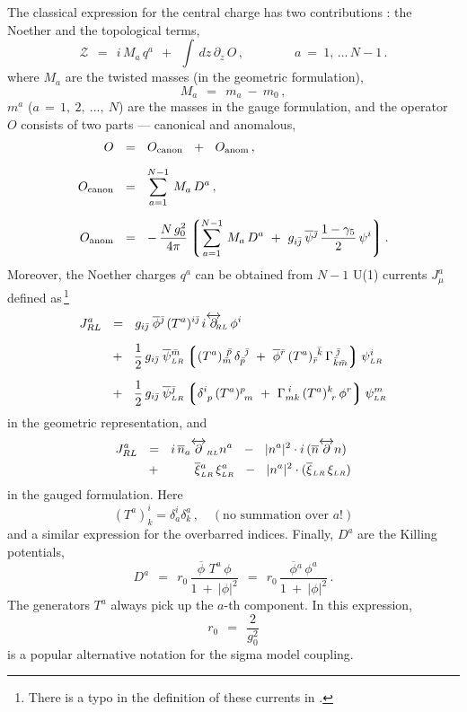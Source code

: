 \documentclass[epsfig,12pt]{article}
\def\beq{\begin{equation}}
\def\eeq{\end{equation}}
\def\beq{\begin{equation}}
\def\eeq{\end{equation}}
\newcommand{\p}{\partial}
\newcommand{\ov}{\overline}
\newcommand{\mc}[1]{\mathcal{#1}}
\newcommand{\lgr}{\left\lgroup}
\newcommand{\rgr}{\right\rgroup}
\newcommand{\bpsi}{\ov{\psi}{}}
\newcommand{\bphi}{\ov{\phi}{}}
\newcommand{\bxi}{\ov{\xi}{}}
\newcommand{\bj}{{\bar \jmath}}
\newcommand{\bmm}{{\bar m}}
\newcommand{\bp}{{\bar p}}
\newcommand{\bkk}{{\bar k}}
\newcommand{\br}{{\bar r}}
\begin{document}
	The classical expression for the central charge has two contributions \cite{SVZw}:
	the Noether and the topological terms,
\beq
        \mc{Z} ~~=~~ i\, M_a\, q^a  ~~+~~ \int\, dz\, \p_z\, O \,, \qquad\qquad
	a ~=~ 1,\,...\, N-1\,.
	\label{21}
\eeq
	where $ M_a $ are the twisted masses (in the geometric formulation),
\beq
	M_a  ~~=~~ m_a ~-~ m_0\,,
\eeq
	$m^a$ ($a \,=\, 1,~2,~ ...,~N $) are the masses in the gauge formulation, 
	and the operator $O$ consists of two parts --- canonical and anomalous,
\begin{align}
%
	O & ~~=~~ 
	O_{\rm canon} ~~+~~ O_{\rm anom}\,,
\\[2mm]
%
	O_{\rm canon } 
\label{23}
	& ~~=~~ 
	\sum_{a= 1}^{N-1}\, M_a\, D^a\,,
\\[2mm]
%
	O_{\rm anom} 
\label{24}
	& ~~=~~
	-\, \frac{N\, g_0^2}{4\pi} 
	\lgr
	\sum_{a=1}^{N-1}\, M_a\, D^a ~+~ g_{i\bar{j}} \,\bpsi{}^\bj\, \frac{1-\gamma_5}{2}\,\psi^i
	\rgr.
\end{align}
	Moreover, the Noether charges $ q^a $ can be obtained from $N-1$ U(1) currents $ J_\mu^a $
	defined as\,\footnote{There is a typo in the definition of these currents in \cite{SVZw}.}
\begin{align}
%
	J_{RL}^a  
	& ~~=~~
	 g_{i\bj}\; \bphi^\bj\, (T^a)^{i\bj}\, i\overleftrightarrow{\p}{}_{\scriptscriptstyle \!\!\!\!RL}\, \phi^i   
\nonumber
	\\[2mm]
%
        & 
	~~+~~
        \frac{1}{2}\, g_{i\bj}\; \bpsi{}_{\scriptscriptstyle LR}^\bmm 
        	\lgr  ( T^a )_\bmm^{\ \bp}\, \delta_\bp^{\ \bj} ~+~ 
		\bphi{}^\br\, (T^a)_\br^{\ \bkk}\, \Gamma^{\;\bj}_{\bkk\bmm} \rgr   \psi_{\scriptscriptstyle LR}^i 
\nonumber 
	\\[2mm]
%
        & 
	~~+~~
        \frac{1}{2}\, g_{i\bj}\; \bpsi{}_{\scriptscriptstyle LR}^\bj
               \lgr  \delta^i_{\ p}\, (T^a)^p_{\ m} ~+~ 
	             \Gamma_{mk}^{\;i}\, (T^a)^k_{\ r}\, \phi^r \rgr   \psi_{\scriptscriptstyle LR}^m
\label{u1cur}
\end{align}
	in the geometric representation, and
\begin{align}
%
\notag
       J_{RL}^a  & ~~=~~ i\, \ov{n}{}_a \overleftrightarrow{\p}_{\scriptscriptstyle RL} n^a 
                   ~~-~~ |n^a|^2 \cdot i\, ( \ov{n} \overleftrightarrow{\p} n ) \\
%
                 & ~~+~~ \qquad 
                         \bxi{}_{\scriptscriptstyle LR}^a\, \xi_{\scriptscriptstyle LR}^a  ~~-~~
                         |n^a|^2 \cdot ( \bxi{}_{\scriptscriptstyle LR}\, \xi_{\scriptscriptstyle LR} )
\end{align}
	in the gauged formulation. 
	Here
 \beq
 	\left(T^a\right)^i_k = \delta_a^i\delta^a_k \,,\quad (\mbox{no summation over $a$!})
 \eeq
	and a similar expression for the overbarred indices.
	Finally,
$ D^a $ 
	are the Killing potentials,
\beq
	D^a  ~~=~~ r_0\, \frac{ \bphi\,\, T^a\, \phi } 
	                    {  1  ~+~  |\phi|^2  }
	     ~~=~~ r_0\, \frac{ \bphi^a\, \phi^a   }
	                    {  1  ~+~  |\phi|^2  }\,.
	                    \label{29}
\eeq
	The generators $ T^a $ always pick up the $ a $-th component.
	In this expression, 
\beq
	r _0  ~~=~~ \frac{ 2 }{ g_0^2}
\eeq 
	is a popular alternative notation for the sigma model coupling.
	
\end{document}
